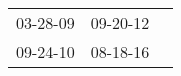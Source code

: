 \begin{supertabular}{p{0.33\columnwidth}p{0.33\columnwidth}p{0.33\columnwidth}}
 03-28-09\textsuperscript{} &  09-20-12\textsuperscript{} \\
 09-24-10\textsuperscript{} &  08-18-16\textsuperscript{} \\
\end{supertabular}
